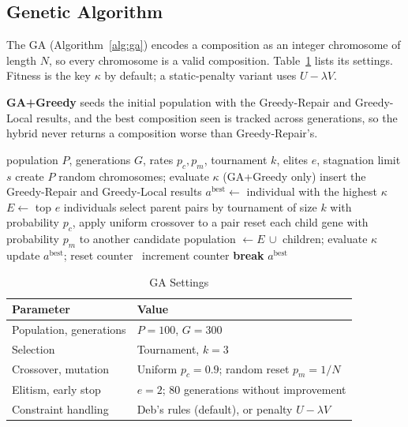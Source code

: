 \documentclass[conference]{IEEEtran}
\begin{document}
\subsection{Genetic Algorithm}
The GA (Algorithm~\ref{alg:ga}) encodes a composition as an integer chromosome of length $N$, so every chromosome is a valid composition. Table~\ref{tab:ga} lists its settings. Fitness is the key $\kappa$ by default; a static-penalty variant uses $U-\lambda V$.

\textbf{GA+Greedy} seeds the initial population with the Greedy-Repair and Greedy-Local results, and the best composition seen is tracked across generations, so the hybrid never returns a composition worse than Greedy-Repair's.

\begin{algorithm}[t]
\caption{Genetic Algorithm Composer}\label{alg:ga}
\footnotesize
\begin{algorithmic}[1]
\Require population $P$, generations $G$, rates $p_c,p_m$, tournament $k$, elites $e$, stagnation limit $s$
\State create $P$ random chromosomes; evaluate $\kappa$
\State (GA+Greedy only) insert the Greedy-Repair and Greedy-Local results
\State $a^{\text{best}} \gets$ individual with the highest $\kappa$
  \State $E\gets$ top $e$ individuals
  \State select parent pairs by tournament of size $k$
  \State with probability $p_c$, apply uniform crossover to a pair
  \State reset each child gene with probability $p_m$ to another candidate
  \State population $\gets E\,\cup$ children; evaluate $\kappa$
   update $a^{\text{best}}$; reset counter
  \Else\ increment counter
  \EndIf
   \textbf{break}
  \EndIf
\EndFor
\State \Return $a^{\text{best}}$
\end{algorithmic}
\end{algorithm}

\begin{table}[t]
\centering
\caption{GA Settings}\label{tab:ga}
\footnotesize
\begin{tabular}{ll}
\toprule
Parameter & Value \\
\midrule
Population, generations & $P=100$, $G=300$ \\
Selection & Tournament, $k=3$ \\
Crossover, mutation & Uniform $p_c=0.9$; random reset $p_m=1/N$ \\
Elitism, early stop & $e=2$; 80 generations without improvement \\
Constraint handling & Deb's rules (default), or penalty $U-\lambda V$ \\
\bottomrule
\end{tabular}
\end{table}
\end{document}
